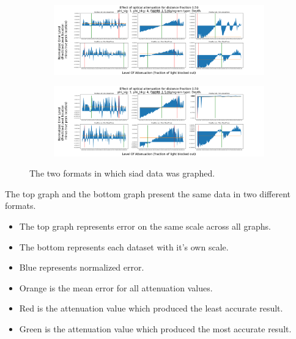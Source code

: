\documentclass{beamer}
\begin{document}
\begin{frame}
  \begin{figure}[H]
    \centering
    \begin{subfigure}[b]{1\textwidth}
      \includegraphics[width=1\linewidth]{SharedyExample.png}
      \label{fig:Ng1}
    \end{subfigure}
    \begin{subfigure}[b]{1\textwidth}
      \includegraphics[width=1\linewidth]{ZoomedyExample.png}
      \label{fig:Ng2}
    \end{subfigure}
    \caption{\label{fig:Data}The two formats in which siad data was graphed.}
  \end{figure}
\end{frame}

\begin{frame}
  The top graph and the bottom graph present the same data in two different formats.
  \begin{itemize} 
  \item The top graph represents error on the same scale across all graphs.
  \item The bottom represents each dataset with it's own scale.
  \item Blue represents normalized error.
  \item Orange is the mean error for all attenuation values.
  \item Red is the attenuation value which produced the least accurate result.
  \item Green is the attenuation value which produced the most accurate result.
  \end{itemize}
\end{frame}
\end{document}
